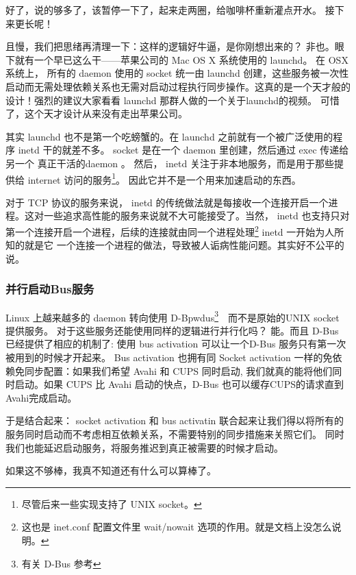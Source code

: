 \begin{insertnote}
好了，说的够多了，该暂停一下了，起来走两圈，给咖啡杯重新灌点开水。
接下来更长呢！

且慢，我们把思绪再清理一下：这样的逻辑好牛逼，是你刚想出来的？ 非也。眼下就有一个早已这么干——苹果公司的 Mac OS X 系统使用的 launchd。 在 OSX 系统上， 所有的 daemon 使用的 socket 统一由 launchd 创建，这些服务被一次性启动而无需处理依赖关系也无需对启动过程执行同步操作。这真的是一个天才般的设计！强烈的建议大家看看 launchd 那群人做的一个关于launchd的视频。 可惜了，这个天才设计从来没有走出苹果公司。

其实 launchd 也不是第一个吃螃蟹的。在 launchd 之前就有一个被广泛使用的程序 inetd 干的就差不多。
socket 是在一个 daemon 里创建，然后通过 exec 传递给另一个 真正干活的daemon 。 然后， inetd  关注于非本地服务，而是用于那些提供给 internet 访问的服务\footnote{尽管后来一些实现支持了 UNIX socket。}。
因此它并不是一个用来加速启动的东西。

对于 TCP 协议的服务来说， inetd 的传统做法就是每接收一个连接开启一个进程。这对一些追求高性能的服务来说就不大可能接受了。当然， inetd 也支持只对第一个连接开启一个进程，后续的连接就由同一个进程处理\footnote{这也是 inet.conf 配置文件里 wait/nowait 选项的作用。就是文档上没怎么说明。} inetd 一开始为人所知的就是它 一个连接一个进程的做法，导致被人诟病性能问题。其实好不公平的说。

\subsubsection*{并行启动Bus服务\footnotemark}


Linux 上越来越多的 daemon 转向使用 D-Bpwdus\footnote{有关 D-Bus 参考  }　而不是原始的UNIX socket 提供服务。
对于这些服务还能使用同样的逻辑进行并行化吗？
能。而且 D-Bus 已经提供了相应的机制了: 使用 bus activation 可以让一个D-Bus 服务只有第一次被用到的时候才开起来。
Bus activation 也拥有同 Socket activation 一样的免依赖免同步配置：如果我们希望 Avahi 和 CUPS 同时启动, 我们就真的能将他们同时启动。如果 CUPS 比 Avahi 启动的快点，D-Bus 也可以缓存CUPS的请求直到Avahi完成启动。

于是结合起来： socket activation 和 bus activatin 联合起来让我们得以将所有的服务同时启动而不考虑相互依赖关系，不需要特别的同步措施来关照它们。
同时我们也能延迟启动服务，将服务推迟到真正被需要的时候才启动。

如果这不够棒，我真不知道还有什么可以算棒了。

\end{insertnote}

